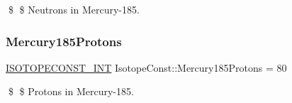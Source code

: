 \$ \$ Neutrons in Mercury-\/185. \mbox{\label{group___isotope_const-_mercury-_hg185_ga94ee469e857d239c5c01b8712ae7d43a}} 
\subsubsection{\texorpdfstring{Mercury185\+Protons}{Mercury185Protons}}
{\footnotesize\ttfamily \mbox{\hyperlink{group___isotope_const-_macros_ga5f18360b3e99483a35c32d789e62621c}{I\+S\+O\+T\+O\+P\+E\+C\+O\+N\+S\+T\+\_\+\+I\+NT}} Isotope\+Const\+::\+Mercury185\+Protons = 80}

\$ \$ Protons in Mercury-\/185. 